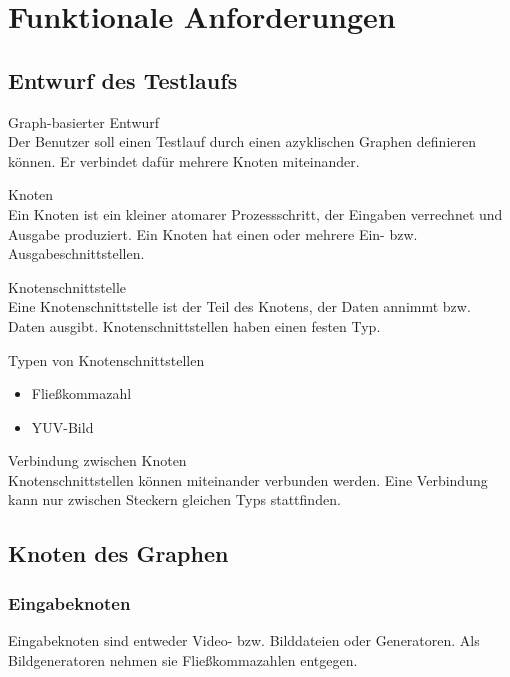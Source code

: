 \section{Funktionale Anforderungen}

\subsection{Entwurf des Testlaufs}

\begin{speclist}[F]
\setcounter{specnum}{11010}

\spec Graph-basierter Entwurf \\
Der Benutzer soll einen Testlauf durch einen azyklischen Graphen definieren können. Er verbindet dafür mehrere Knoten miteinander.

\spec Knoten \\
Ein Knoten ist ein kleiner atomarer Prozessschritt, der Eingaben verrechnet und Ausgabe produziert. Ein Knoten hat einen oder mehrere Ein- bzw. Ausgabeschnittstellen.

\spec Knotenschnittstelle \\
Eine Knotenschnittstelle ist der Teil des Knotens, der Daten annimmt bzw. Daten ausgibt. Knotenschnittstellen haben einen festen Typ.

\spec Typen von Knotenschnittstellen
\begin{itemize}
	\item Fließkommazahl
	\item YUV-Bild
\end{itemize}

\spec Verbindung zwischen Knoten \\
Knotenschnittstellen können miteinander verbunden werden. Eine Verbindung kann nur zwischen Steckern gleichen Typs stattfinden.

\end{speclist}

\subsection{Knoten des Graphen}

\subsubsection{Eingabeknoten}
Eingabeknoten sind entweder Video- bzw. Bilddateien oder Generatoren. Als Bildgeneratoren nehmen sie Fließkommazahlen entgegen.

